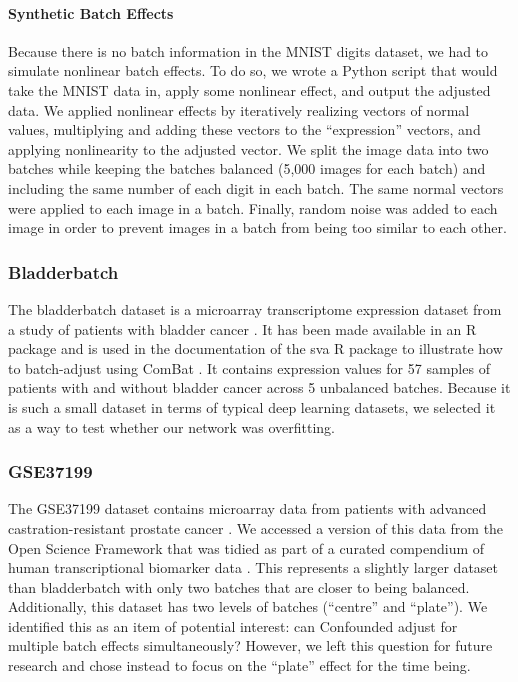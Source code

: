 \documentclass[notitlepage]{article}
\begin{document}
\paragraph{Synthetic Batch Effects}

Because there is no batch information in the MNIST digits dataset, we had to simulate nonlinear batch effects.
To do so, we wrote a Python script that would take the MNIST data in, apply some nonlinear effect, and output the adjusted data.
We applied nonlinear effects by iteratively realizing vectors of normal values, multiplying and adding these vectors to the ``expression'' vectors, and applying nonlinearity to the adjusted vector.
We split the image data into two batches while keeping the batches balanced (5,000 images for each batch) and including the same number of each digit in each batch.
The same normal vectors were applied to each image in a batch.
Finally, random noise was added to each image in order to prevent images in a batch from being too similar to each other.

\subsubsection{Bladderbatch}

The bladderbatch dataset is a microarray transcriptome expression dataset from a study of patients with bladder cancer \cite{dyrskjot_gene_2004}.
It has been made available in an R package \cite{leek_bladderbatch_2017} and is used in the documentation of the sva R package to illustrate how to batch-adjust using ComBat \cite{leek_sva_2017}.
It contains expression values for 57 samples of patients with and without bladder cancer across 5 unbalanced batches.
Because it is such a small dataset in terms of typical deep learning datasets, we selected it as a way to test whether our network was overfitting.

\subsubsection{GSE37199}

The GSE37199 dataset contains microarray data from patients with advanced castration-resistant prostate cancer \cite{olmos_prognostic_2012}.
We accessed a version of this data from the Open Science Framework that was tidied as part of a curated compendium of human transcriptional biomarker data \cite{golightly_curated_2018}.
This represents a slightly larger dataset than bladderbatch with only two batches that are closer to being balanced.
Additionally, this dataset has two levels of batches (``centre'' and ``plate'').
We identified this as an item of potential interest: can Confounded adjust for multiple batch effects simultaneously?
However, we left this question for future research and chose instead to focus on the ``plate'' effect for the time being.
\end{document}
